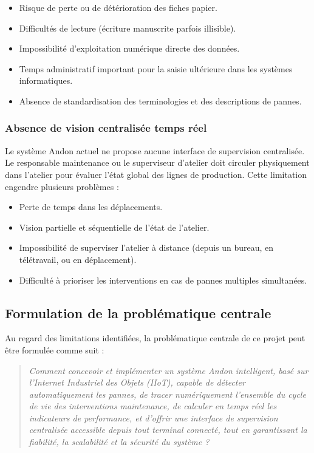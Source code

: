 \begin{itemize}
    \item Risque de perte ou de détérioration des fiches papier.
    \item Difficultés de lecture (écriture manuscrite parfois illisible).
    \item Impossibilité d'exploitation numérique directe des données.
    \item Temps administratif important pour la saisie ultérieure dans les systèmes informatiques.
    \item Absence de standardisation des terminologies et des descriptions de pannes.
\end{itemize}

\subsubsection{Absence de vision centralisée temps réel}

Le système Andon actuel ne propose aucune interface de supervision centralisée. Le responsable maintenance ou le superviseur d'atelier doit circuler physiquement dans l'atelier pour évaluer l'état global des lignes de production. Cette limitation engendre plusieurs problèmes :

\begin{itemize}
    \item Perte de temps dans les déplacements.
    \item Vision partielle et séquentielle de l'état de l'atelier.
    \item Impossibilité de superviser l'atelier à distance (depuis un bureau, en télétravail, ou en déplacement).
    \item Difficulté à prioriser les interventions en cas de pannes multiples simultanées.
\end{itemize}


\subsection{Formulation de la problématique centrale}

Au regard des limitations identifiées, la problématique centrale de ce projet peut être formulée comme suit :

\begin{quote}
\textit{Comment concevoir et implémenter un système Andon intelligent, basé sur l'Internet Industriel des Objets (IIoT), capable de détecter automatiquement les pannes, de tracer numériquement l'ensemble du cycle de vie des interventions maintenance, de calculer en temps réel les indicateurs de performance, et d'offrir une interface de supervision centralisée accessible depuis tout terminal connecté, tout en garantissant la fiabilité, la scalabilité et la sécurité du système ?}
\end{quote}

